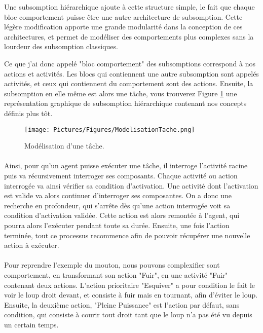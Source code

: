 \documentclass[11pt,a4paper]{article}
\begin{document}
			Une subsomption hiérarchique ajoute à cette structure simple, le fait que chaque bloc comportement puisse être une autre architecture de subsomption. Cette légère modification apporte une grande modularité dans la conception de ces architectures, et permet de modéliser des comportements plus complexes sans la lourdeur des subsomption classiques.
			
			Ce que j'ai donc appelé "bloc comportement" des subsomptions correspond à nos actions et activités. Les blocs qui contiennent une autre subsomption sont appelés activités, et ceux qui contiennent du comportement sont des actions. Ensuite, la subsomption en elle même est alors une tâche, vous trouverez Figure \ref{ModelisationTache} une représentation graphique de subsomption hiérarchique contenant nos concepts définis plus tôt.
			
			\begin{figure}
			\centering
			\texttt{[image: Pictures/Figures/ModelisationTache.png]}
			\caption{Modélisation d'une tâche.}
			\label{ModelisationTache}
			\end{figure}
		\paragraph{}
			Ainsi, pour qu'un agent puisse exécuter une tâche, il interroge l'activité racine puis va récursivement interroger ses composants. Chaque activité ou action interrogée va ainsi vérifier sa condition d'activation. Une activité dont l'activation est valide va alors continuer d'interroger ses composantes. On a donc une recherche en profondeur, qui s'arrête dès qu'une action interrogée voit sa condition d'activation validée. Cette action est alors remontée à l'agent, qui pourra alors l'exécuter pendant toute sa durée. Ensuite, une fois l'action terminée, tout ce processus recommence afin de pouvoir récupérer une nouvelle action à exécuter.
			
			\paragraph{}
			Pour reprendre l'exemple du mouton, nous pouvons complexifier sont comportement, en transformant son action "Fuir", en une activité "Fuir" contenant deux actions. L'action prioritaire "Esquiver" a pour condition le fait le voir le loup droit devant, et consiste à fuir mais en tournant, afin d'éviter le loup. Ensuite, la deuxième action, "Pleine Puissance" est l'action par défaut, sans condition, qui consiste à courir tout droit tant que le loup n'a pas été vu depuis un certain temps.
			
\end{document}
